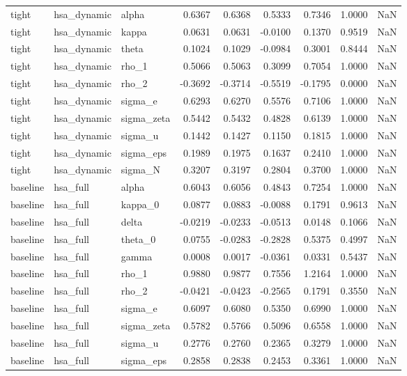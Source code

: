 \begin{tabular}{lllrrrrrl}
tight & hsa\_dynamic & alpha & 0.6367 & 0.6368 & 0.5333 & 0.7346 & 1.0000 & NaN \\
tight & hsa\_dynamic & kappa & 0.0631 & 0.0631 & -0.0100 & 0.1370 & 0.9519 & NaN \\
tight & hsa\_dynamic & theta & 0.1024 & 0.1029 & -0.0984 & 0.3001 & 0.8444 & NaN \\
tight & hsa\_dynamic & rho\_1 & 0.5066 & 0.5063 & 0.3099 & 0.7054 & 1.0000 & NaN \\
tight & hsa\_dynamic & rho\_2 & -0.3692 & -0.3714 & -0.5519 & -0.1795 & 0.0000 & NaN \\
tight & hsa\_dynamic & sigma\_e & 0.6293 & 0.6270 & 0.5576 & 0.7106 & 1.0000 & NaN \\
tight & hsa\_dynamic & sigma\_zeta & 0.5442 & 0.5432 & 0.4828 & 0.6139 & 1.0000 & NaN \\
tight & hsa\_dynamic & sigma\_u & 0.1442 & 0.1427 & 0.1150 & 0.1815 & 1.0000 & NaN \\
tight & hsa\_dynamic & sigma\_eps & 0.1989 & 0.1975 & 0.1637 & 0.2410 & 1.0000 & NaN \\
tight & hsa\_dynamic & sigma\_N & 0.3207 & 0.3197 & 0.2804 & 0.3700 & 1.0000 & NaN \\
baseline & hsa\_full & alpha & 0.6043 & 0.6056 & 0.4843 & 0.7254 & 1.0000 & NaN \\
baseline & hsa\_full & kappa\_0 & 0.0877 & 0.0883 & -0.0088 & 0.1791 & 0.9613 & NaN \\
baseline & hsa\_full & delta & -0.0219 & -0.0233 & -0.0513 & 0.0148 & 0.1066 & NaN \\
baseline & hsa\_full & theta\_0 & 0.0755 & -0.0283 & -0.2828 & 0.5375 & 0.4997 & NaN \\
baseline & hsa\_full & gamma & 0.0008 & 0.0017 & -0.0361 & 0.0331 & 0.5437 & NaN \\
baseline & hsa\_full & rho\_1 & 0.9880 & 0.9877 & 0.7556 & 1.2164 & 1.0000 & NaN \\
baseline & hsa\_full & rho\_2 & -0.0421 & -0.0423 & -0.2565 & 0.1791 & 0.3550 & NaN \\
baseline & hsa\_full & sigma\_e & 0.6097 & 0.6080 & 0.5350 & 0.6990 & 1.0000 & NaN \\
baseline & hsa\_full & sigma\_zeta & 0.5782 & 0.5766 & 0.5096 & 0.6558 & 1.0000 & NaN \\
baseline & hsa\_full & sigma\_u & 0.2776 & 0.2760 & 0.2365 & 0.3279 & 1.0000 & NaN \\
baseline & hsa\_full & sigma\_eps & 0.2858 & 0.2838 & 0.2453 & 0.3361 & 1.0000 & NaN \\

\end{tabular}
